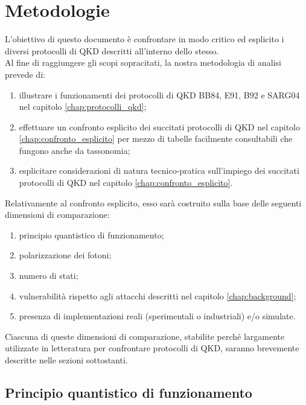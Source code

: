 \chapter{Metodologie}
\label{chap:metodologie}
L’obiettivo di questo documento è confrontare in modo critico ed esplicito i diversi protocolli di QKD descritti all’interno dello stesso.\\
Al fine di raggiungere gli scopi sopracitati, la nostra metodologia di analisi prevede di:
\begin{enumerate}
    \item illustrare i funzionamenti dei protocolli di QKD BB84, E91, B92 e SARG04 nel capitolo \ref{chap:protocolli_qkd};
    \item effettuare un confronto esplicito dei succitati protocolli di QKD nel capitolo \ref{chap:confronto_esplicito} per mezzo di tabelle facilmente consultabili che fungono anche da tassonomia;
    \item esplicitare considerazioni di natura tecnico-pratica sull'impiego dei succitati protocolli di QKD nel capitolo
    \ref{chap:confronto_esplicito}.
\end{enumerate} 
Relativamente al confronto esplicito, esso sarà costruito sulla base delle seguenti dimensioni di comparazione:
\begin{enumerate}
    \item principio quantistico di funzionamento;
    \item polarizzazione dei fotoni;
    \item numero di stati;
    \item vulnerabilità rispetto agli attacchi descritti nel capitolo \ref{chap:background};
    \item presenza di implementazioni reali (sperimentali o industriali) e/o simulate.
\end{enumerate} 
Ciascuna di queste dimensioni di comparazione, stabilite perché largamente utilizzate in letteratura per confrontare protocolli di QKD, saranno brevemente descritte nelle sezioni sottostanti.

\section{Principio quantistico di funzionamento}

